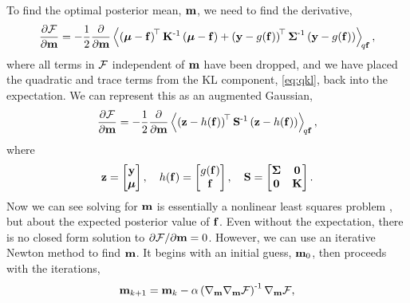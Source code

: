 \documentclass{article} %
\begin{document}
To find the optimal posterior mean, $\pomean$, we need to find the derivative,
\begin{equation}
    \frac{\partial\Fengy}{\partial\pomean} = -\frac{1}{2}
    \frac{\partial}{\partial\pomean} \expec{q\lstate}{
        \brac{\prmean - \lstate}\transpose\prcov\inv
        \brac{\prmean - \lstate}
        + \brac{\obs - \nonlin{\lstate}}\transpose \lcov\inv
            \brac{\obs - \nonlin{\lstate}}},
\end{equation}
where all terms in $\Fengy$ independent of $\pomean$ have been dropped, and we
have placed the quadratic and trace terms from the KL component,
\eqref{eq:qkl}, back into the expectation.
We can represent this as an augmented Gaussian,
\begin{equation}
    \frac{\partial\Fengy}{\partial\pomean} = -\frac{1}{2}
        \frac{\partial}{\partial\pomean}
        \expec{q\lstate}{
        \brac{\augobs - \augnonlin{\lstate}}\transpose\augcov\inv
        \brac{\augobs - \augnonlin{\lstate}}
    },
    \label{eq:augsys}
\end{equation}
where
\begin{equation}
    \augobs = \begin{bmatrix} \obs \\ \prmean \end{bmatrix}, \quad
    \augnonlin{\lstate} = \begin{bmatrix} \nonlin{\lstate} \\ \lstate 
        \end{bmatrix}, \quad
    \augcov = \begin{bmatrix} \lcov & \mathbf{0} \\ \mathbf{0} & \prcov 
        \end{bmatrix}.
\end{equation}
Now we can see solving for $\pomean$ is essentially a nonlinear least squares 
problem%
, but about
the expected posterior value of $\lstate$. Even without the expectation, there
is no  closed form solution to $\partial\Fengy/\partial\pomean = 0$.
However, we can use an iterative Newton method to find $\pomean$. It begins
with an initial guess, $\pomean_0$, then proceeds with the iterations,
\begin{equation}
    \pomean_{k+1} = \pomean_k -
    \step\brac{\nabla_\pomean\nabla_\pomean\Fengy}\inv \nabla_\pomean\Fengy,
    \label{eq:newton}
\end{equation}
\end{document}
